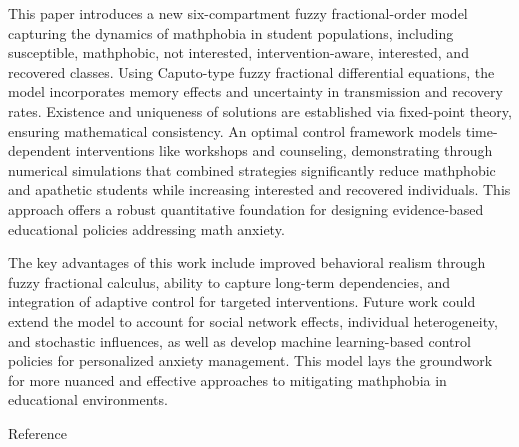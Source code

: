 \documentclass[10pt]{NSP1}
\begin{document}
\par\medskip{}\smallskip

This paper introduces a new six-compartment fuzzy fractional-order model capturing the dynamics of mathphobia in student populations, including susceptible, mathphobic, not interested, intervention-aware, interested, and recovered classes. Using Caputo-type fuzzy fractional differential equations, the model incorporates memory effects and uncertainty in transmission and recovery rates. Existence and uniqueness of solutions are established via fixed-point theory, ensuring mathematical consistency. An optimal control framework models time-dependent interventions like workshops and counseling, demonstrating through numerical simulations that combined strategies significantly reduce mathphobic and apathetic students while increasing interested and recovered individuals. This approach offers a robust quantitative foundation for designing evidence-based educational policies addressing math anxiety.

The key advantages of this work include improved behavioral realism through fuzzy fractional calculus, ability to capture long-term dependencies, and integration of adaptive control for targeted interventions. Future work could extend the model to account for social network effects, individual heterogeneity, and stochastic influences, as well as develop machine learning-based control policies for personalized anxiety management. This model lays the groundwork for more nuanced and effective approaches to mitigating mathphobia in educational environments.

Reference
\end{document}
